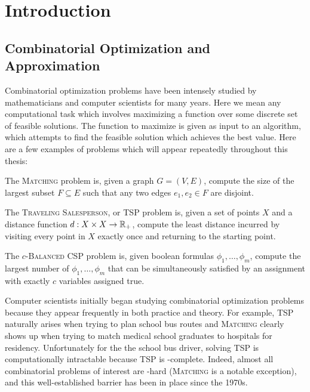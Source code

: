 \chapter{Introduction}\label{cha:introduction}

\section{Combinatorial Optimization and Approximation}
Combinatorial optimization problems have been intensely studied by mathematicians and computer scientists for many years.
Here we mean any computational task which involves maximizing a function over some discrete set of feasible solutions.
The function to maximize is given as input to an algorithm, which attempts to find the feasible solution which achieves the best value. 
Here are a few examples of problems which will appear repeatedly throughout this thesis: 
\begin{example}
The \textsc{Matching} problem is, given a graph $G = (V,E)$, compute the size of the largest subset $F \subseteq E$ such that any two edges $e_1,e_2 \in F$ are disjoint.
\end{example}
\begin{example}
The \textsc{Traveling Salesperson}, or \textsc{TSP} problem is, given a set of points $X$ and a distance function $d: X \times X \rightarrow \mathbb R_+$, compute the least distance incurred by visiting every point in $X$ exactly once and returning to the starting point.
\end{example}
\begin{example}
The \textsc{$c$-Balanced CSP} problem is, given boolean formulas $\phi_1,\dots,\phi_m$, compute the largest number of $\phi_1,\dots,\phi_m$ that can be simultaneously satisfied by an assignment with exactly $c$ variables assigned true.
\end{example}

Computer scientists initially began studying combinatorial optimization problems because they appear frequently in both practice and theory.
For example, \textsc{TSP} naturally arises when trying to plan school bus routes and \textsc{Matching} clearly shows up when trying to match medical school graduates to hospitals for residency. Unfortunately for the the school bus driver, solving \textsc{TSP} is computationally intractable because \textsc{TSP} is \np-complete\cite{Karp1972}. Indeed, almost all combinatorial problems of interest are \np-hard (\textsc{Matching} is a notable exception), and this well-established barrier has been in place since the 1970s.


